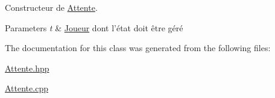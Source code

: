 Constructeur de \hyperlink{class_attente}{Attente}. 


\begin{DoxyParams}{Parameters}
{\em t} & \hyperlink{class_joueur}{Joueur} dont l'état doit être géré \\
\hline
\end{DoxyParams}


The documentation for this class was generated from the following files\-:\begin{DoxyCompactItemize}
\item 
\hyperlink{_attente_8hpp}{Attente.\-hpp}\item 
\hyperlink{_attente_8cpp}{Attente.\-cpp}\end{DoxyCompactItemize}
